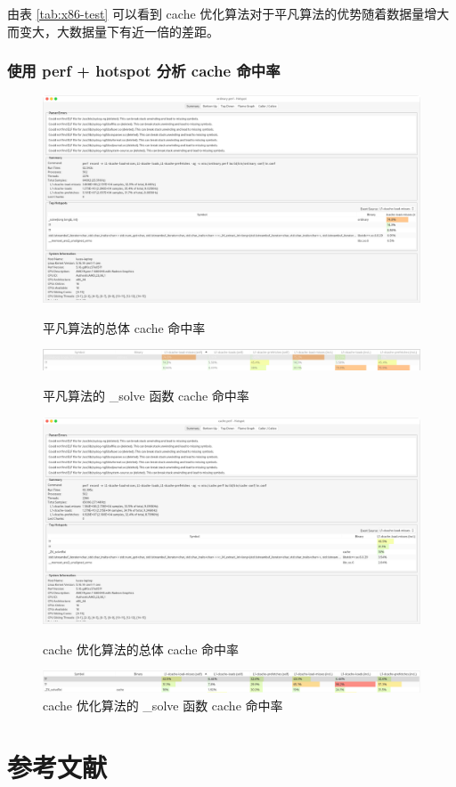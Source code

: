\documentclass[a4paper]{article}
\begin{document}
由表 \ref{tab:x86-test} 可以看到 cache 优化算法对于平凡算法的优势随着数据量增大而变大，大数据量下有近一倍的差距。

\subsubsection{使用 perf + hotspot 分析 cache 命中率}
\begin{figure}[H]
  \centering
  \includegraphics[width=\textwidth]{perf-ord-hotspot-1.png}
  \caption{平凡算法的总体 cache 命中率}
  \label{pic:ord1}

  \centering
  \includegraphics[width=\textwidth]{perf-ord-hotspot-2.png}
  \caption{平凡算法的 _solve 函数 cache 命中率}
  \label{pic:ord2}

  \centering
  \includegraphics[width=\textwidth]{perf-cache-hotspot-1.png}
  \caption{cache 优化算法的总体 cache 命中率}
  \label{pic:cache1}

  \centering
  \includegraphics[width=\textwidth]{perf-cache-hotspot-2.png}
  \caption{cache 优化算法的 _solve 函数 cache 命中率}
  \label{pic:cache2}
\end{figure}

\newpage

\section{参考文献}
\cite{1}\cite{2}\cite{3}\cite{4}\cite{5}\cite{6}



\end{document}
